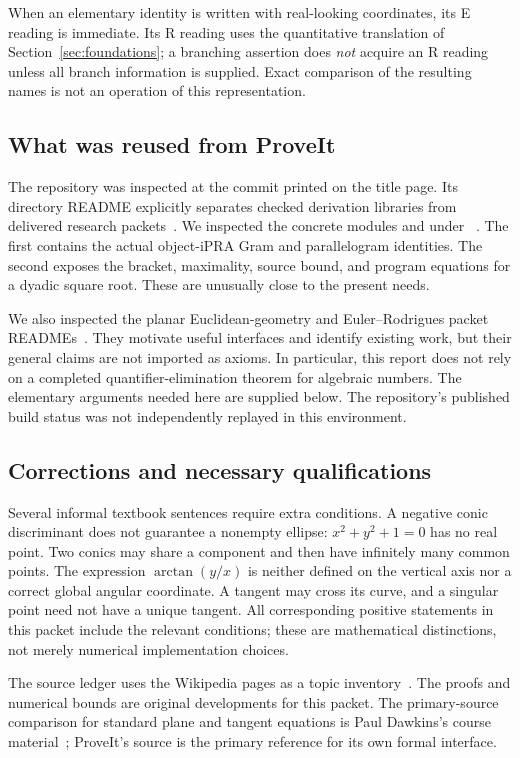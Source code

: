 When an elementary identity is written with real-looking coordinates, its E reading is immediate. Its R reading uses the quantitative translation of Section~\ref{sec:foundations}; a branching assertion does \emph{not} acquire an R reading unless all branch information is supplied. Exact comparison of the resulting names is not an operation of this representation.

\subsection{What was reused from ProveIt}

The repository was inspected at the commit printed on the title page. Its directory README explicitly separates checked derivation libraries from delivered research packets~\cite{repo-main}. We inspected the concrete modules
 and
 under
~\cite{repo-metric,repo-sqrt}.
The first contains the actual object-iPRA Gram and parallelogram identities. The second exposes the bracket, maximality, source bound, and program equations for a dyadic square root. These are unusually close to the present needs.

We also inspected the planar Euclidean-geometry and Euler--Rodrigues packet READMEs~\cite{repo-plane-packet,repo-rotation-packet}. They motivate useful interfaces and identify existing work, but their general claims are not imported as axioms. In particular, this report does not rely on a completed quantifier-elimination theorem for algebraic numbers. The elementary arguments needed here are supplied below. The repository's published build status was not independently replayed in this environment.

\subsection{Corrections and necessary qualifications}

Several informal textbook sentences require extra conditions. A negative conic discriminant does not guarantee a nonempty ellipse: $x^2+y^2+1=0$ has no real point. Two conics may share a component and then have infinitely many common points. The expression $\arctan(y/x)$ is neither defined on the vertical axis nor a correct global angular coordinate. A tangent may cross its curve, and a singular point need not have a unique tangent. All corresponding positive statements in this packet include the relevant conditions; these are mathematical distinctions, not merely numerical implementation choices.

The source ledger uses the Wikipedia pages as a topic inventory~\cite{wiki-main}. The proofs and numerical bounds are original developments for this packet. The primary-source comparison for standard plane and tangent equations is Paul Dawkins's course material~\cite{dawkins}; ProveIt's source is the primary reference for its own formal interface.

